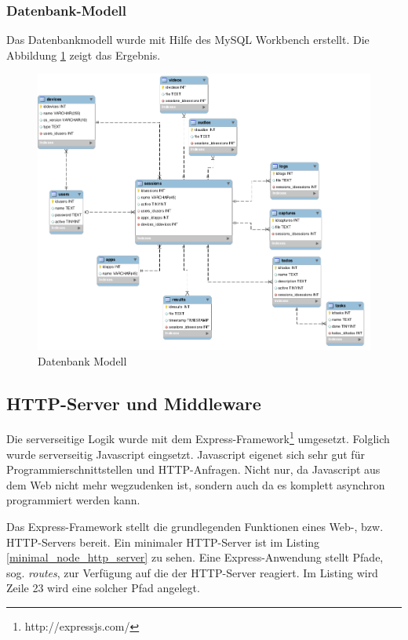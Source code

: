 \subsubsection{Datenbank-Modell}
Das Datenbankmodell wurde mit Hilfe des MySQL Workbench erstellt. Die Abbildung \ref{figure-db-model} zeigt das Ergebnis.
\begin{figure}[h!]
	\centering
	\includegraphics[width=\linewidth,keepaspectratio]{img/db_model.png}
	\caption{Datenbank Modell}
	\label{figure-db-model}
\end{figure}


\subsection{HTTP-Server und Middleware}
Die serverseitige Logik wurde mit dem Express-Framework\footnote{http://expressjs.com/} umgesetzt. Folglich wurde serverseitig Javascript eingsetzt. Javascript eigenet sich sehr gut für Programmierschnittstellen und HTTP-Anfragen. Nicht nur, da Javascript aus dem Web nicht mehr wegzudenken ist, sondern auch da es komplett asynchron programmiert werden kann. 

Das Express-Framework stellt die grundlegenden Funktionen eines Web-, bzw. HTTP-Servers bereit. Ein minimaler HTTP-Server ist im Listing \ref{minimal_node_http_server} zu sehen. Eine Express-Anwendung stellt Pfade, sog. \emph{routes}, zur Verfügung auf die der HTTP-Server reagiert. Im Listing wird Zeile 23 wird eine solcher Pfad angelegt. 

